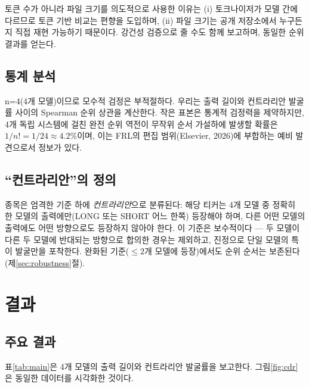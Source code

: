 \documentclass[11pt,letterpaper]{article}
\begin{document}
토큰 수가 아니라 파일 크기를 의도적으로 사용한 이유는 (i) 토크나이저가 모델 간에 다르므로 토큰 기반 비교는 편향을 도입하며, (ii) 파일 크기는 공개 저장소에서 누구든지 직접 재현 가능하기 때문이다. 강건성 검증으로 줄 수도 함께 보고하며, 동일한 순위 결과를 얻는다.

\subsection{통계 분석}

n=4(4개 모델)이므로 모수적 검정은 부적절하다. 우리는 출력 길이와 컨트라리안 발굴률 사이의 Spearman 순위 상관을 계산한다. 작은 표본은 통계적 검정력을 제약하지만, 4개 독립 시스템에 걸친 완전 순위 역전이 무작위 순서 가설하에 발생할 확률은 $1/n!=1/24\approx 4.2\%$이며, 이는 FRL의 편집 범위(Elsevier, 2026)에 부합하는 예비 발견으로서 정보가 있다.

\subsection{``컨트라리안''의 정의}

종목은 엄격한 기준 하에 \textit{컨트라리안}으로 분류된다: 해당 티커는 4개 모델 중 정확히 한 모델의 출력에만(LONG 또는 SHORT 어느 한쪽) 등장해야 하며, 다른 어떤 모델의 출력에도 어떤 방향으로도 등장하지 않아야 한다. 이 기준은 보수적이다 --- 두 모델이 다른 두 모델에 반대되는 방향으로 합의한 경우는 제외하고, 진정으로 단일 모델의 특이 발굴만을 포착한다. 완화된 기준($\leq 2$개 모델에 등장)에서도 순위 순서는 보존된다(제\ref{sec:robustness}절).

\section{결과}\label{sec:results}

\subsection{주요 결과}

표\ref{tab:main}은 4개 모델의 출력 길이와 컨트라리안 발굴률을 보고한다. 그림\ref{fig:cdr}은 동일한 데이터를 시각화한 것이다.
\end{document}
